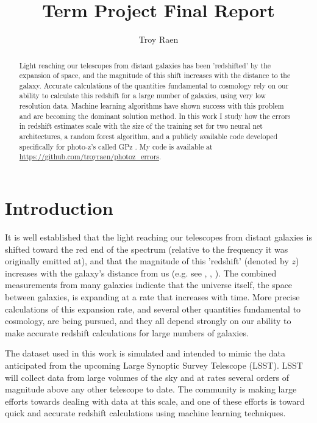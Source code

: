 \documentclass[13pt]{amsart}
\title{Term Project Final Report}
\author{Troy Raen}
\begin{document}


\begin{abstract}
  Light reaching our telescopes from distant galaxies has been 'redshifted' by the expansion of space, and the magnitude of this shift increases with the distance to the galaxy. Accurate calculations of the quantities fundamental to cosmology rely on our ability to calculate this redshift for a large number of galaxies, using very low resolution data. Machine learning algorithms have shown success with this problem and are becoming the dominant solution method. In this work I study how the errors in redshift estimates scale with the size of the training set for two neural net architectures, a random forest algorithm, and a publicly available code developed specifically for photo-z's called GPz \cite{gpz}. My code is available at \url{https://github.com/troyraen/photoz_errors}.
\end{abstract}


\maketitle



\section{Introduction}

  It is well established that the light reaching our telescopes from distant galaxies is shifted toward the red end of the spectrum (relative to the frequency it was originally emitted at), and that the magnitude of this 'redshift' (denoted by $z$) increases with the galaxy's distance from us (e.g. see \cite{newman}, \cite{graham}, \cite{pzreview}). The combined measurements from many galaxies indicate that the universe itself, the space between galaxies, is expanding at a rate that increases with time. More precise calculations of this expansion rate, and several other quantities fundamental to cosmology, are being pursued, and they all depend strongly on our ability to make accurate redshift calculations for large numbers of galaxies.

  The dataset used in this work is simulated and intended to mimic the data anticipated from the upcoming Large Synoptic Survey Telescope (LSST). LSST will collect data from large volumes of the sky and at rates several orders of magnitude above any other telescope to date. The community is making large efforts towards dealing with data at this scale, and one of these efforts is toward quick and accurate redshift calculations using machine learning techniques.
\end{document}
